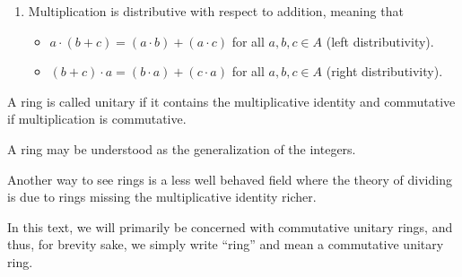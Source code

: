 \begin{defbox}
\begin{definition}[Ring]
\begin{enumerate}
\begin{enumerate}
      \end{enumerate}
      \item {\color{mathobj}Multiplication} is {\color{mathif}distributive} with respect to {\color{mathobj}addition}, meaning that
      \begin{itemize}
        \item \(a \cdot (b + c) = (a \cdot b) + (a \cdot c)\) for all \(a, b, c \in A\) ({\color{mathrem}left distributivity}).
        \item \((b + c) \cdot a = (b \cdot a) + (c \cdot a)\) for all \(a, b, c \in A\) ({\color{mathrem}right distributivity}).
      \end{itemize}
    \end{enumerate}
    A {\color{mathobj}ring} is called {\color{maththen}unitary} if it {\color{mathif}contains} the {\color{mathobj}multiplicative identity} and {\color{maththen}commutative} if {\color{mathobj}multiplication} is {\color{mathif}commutative}.
    \end{definition}
\end{defbox}
%
%
%
\begin{intbox}
    \begin{intuition}
        A ring may be understood as the generalization of the integers.

        Another way to see rings is a less well behaved field where the theory of dividing is due to rings missing the multiplicative identity richer.
    \end{intuition}
\end{intbox}
%
%
%
\begin{rembox}
    \begin{remark}
        In this text, we will primarily be concerned with commutative unitary rings, and thus, for brevity sake, we simply write ``ring'' and mean a commutative unitary ring.
    \end{remark}
\end{rembox}
%
%
%
